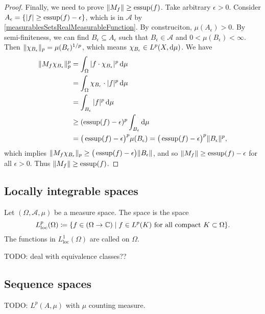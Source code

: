 \begin{proof}
Finally, we need to prove $\lVert M_f\rVert \geq \operatorname{essup}(f)$. Take arbitrary $\epsilon > 0$. Consider $A_\epsilon = \{|f| \geq \operatorname{essup}(f)-\epsilon\}$, which is in $\mathcal{A}$ by \ref{measurablesSetsRealMeasurableFunction}. By construciton, $\mu(A_\epsilon) > 0$. By semi-finiteness, we can find $B_\epsilon\subseteq A_\epsilon$ such that $B_\epsilon\in \mathcal{A}$ and $0 < \mu(B_\epsilon)< \infty$. Then $\lVert\chi_{B_\epsilon}\rVert_p = \mu(B_\epsilon)^{1/p}$, which means $\chi_{B_\epsilon}\in L^p(X, \operatorname{d \!}{\mu})$. We have
\begin{align*}
\lVert M_f\chi_{B_\epsilon}\rVert_p^p &= \int_\Omega |f\cdot \chi_{B_\epsilon}|^{p}\operatorname{d \!}{\mu} \\
&= \int_\Omega \chi_{B_\epsilon}\cdot|f|^p\operatorname{d \!}{\mu} \\
&= \int_{B_\epsilon}|f|^p\operatorname{d \!}{\mu} \\
&\geq (\operatorname{essup}(f)-\epsilon)^p\int_{B_\epsilon}\operatorname{d \!}{\mu} \\
&= \big(\operatorname{essup}(f)-\epsilon\big)^p\mu(B_\epsilon) = \big(\operatorname{essup}(f)-\epsilon\big)^p\lVert B_\epsilon\rVert^p,
\end{align*}
which implies $\lVert M_f\chi_{B_\epsilon}\rVert_p \geq \big(\operatorname{essup}(f)-\epsilon\big)\lVert B_\epsilon\rVert$, and so $\lVert M_f\rVert \geq \operatorname{essup}(f)-\epsilon$ for all $\epsilon >0$. Thus $\lVert M_f\rVert \geq \operatorname{essup}(f)$.
\end{proof}

\subsection{Locally integrable spaces}
\begin{definition}
Let $(\Omega, \mathcal{A}, \mu)$ be a measure space. The  space is the space
\[ L^p_\text{loc}(\Omega) \defeq \setbuilder{f \in (\Omega\to\C)}{\text{$f\in L^p(K)$ for all compact $K\subset \Omega$}}. \]
The functions in $L^1_\text{loc}(\Omega)$ are called  on $\Omega$.
\end{definition}
TODO: deal with equivalence classes??


\subsection{Sequence spaces}
TODO:  $L^p(A,\mu)$ with $\mu$ counting measure.

